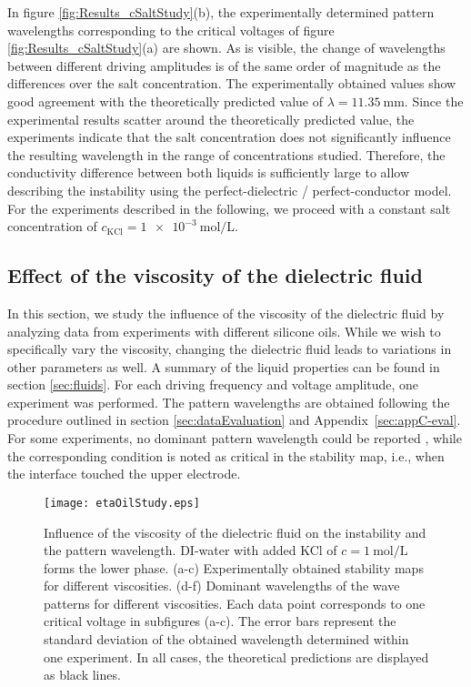 \documentclass{jfm_arxiv}
\begin{document}
In figure \ref{fig:Results_cSaltStudy}(b), the experimentally determined pattern wavelengths corresponding to the critical voltages of figure \ref{fig:Results_cSaltStudy}(a) are shown. As is visible, the change of wavelengths between different driving amplitudes is of the same order of magnitude as the differences over the salt concentration.
The experimentally obtained values show good agreement with the theoretically predicted value of $\lambda =\SI{11.35}{\milli\meter}$. 
Since the experimental results scatter around the theoretically predicted value, the experiments indicate that the salt concentration does not significantly influence the resulting wavelength in the range of concentrations studied. Therefore, the conductivity difference between both liquids is sufficiently large to allow describing the instability using the perfect-dielectric / perfect-conductor model. For the experiments described in the following, we proceed with a constant salt concentration of $c_\text{KCl}=\SI{1e-3}{\mol\per\liter}$.


\subsection{Effect of the viscosity of the dielectric fluid}
In this section, we study the influence of the viscosity of the dielectric fluid by analyzing data from experiments with different silicone oils. While we wish to specifically vary the viscosity, changing the dielectric fluid leads to variations in other parameters as well. A summary of the liquid properties can be found in section \ref{sec:fluids}.
For each driving frequency and voltage amplitude, one experiment was performed. The pattern wavelengths are obtained following the procedure outlined in section \ref{sec:dataEvaluation} and Appendix~\ref{sec:appC-eval}.
For some experiments, no dominant pattern wavelength could be reported , while the corresponding condition is noted as critical in the stability map, i.e., when the interface touched the upper electrode.


\begin{figure}
  \centerline{\texttt{[image: etaOilStudy.eps]}}%
  \caption{Influence of the viscosity of the dielectric fluid on the instability and the pattern wavelength. DI-water with added KCl of $c=\SI{1}{\mol \per \liter}$ forms the lower phase. 
  (a-c) Experimentally obtained stability maps for different viscosities. 
  (d-f) Dominant wavelengths of the wave patterns for different viscosities. Each data point corresponds to one critical voltage in subfigures (a-c).
 The error bars represent the standard deviation of the obtained wavelength determined within one experiment.
   In all cases, the theoretical predictions are displayed as black lines.}
\label{fig:Results_etaOilStudy}
\end{figure}
\end{document}
